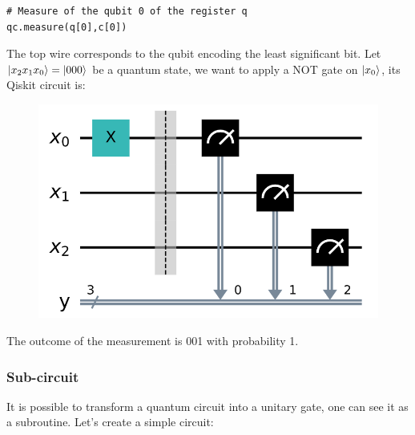 \documentclass{article}
\begin{document}
\begin{verbatim}
# Measure of the qubit 0 of the register q
qc.measure(q[0],c[0])
\end{verbatim}
The top wire corresponds to the qubit encoding the least significant bit. Let $\ket{x_2x_1x_0}=\ket{000}$ be a quantum state, we want to apply a NOT gate on $\ket{x_0}$, its Qiskit circuit is:
\begin{figure}[H]
    \centering
    \includegraphics[scale=0.4]{circ1.png}
\end{figure}
The outcome of the measurement is 001 with probability 1.

\subsubsection{Sub-circuit}

It is possible to transform a quantum circuit into a unitary gate, one can see it as a subroutine. Let's create a simple circuit:
\end{document}
